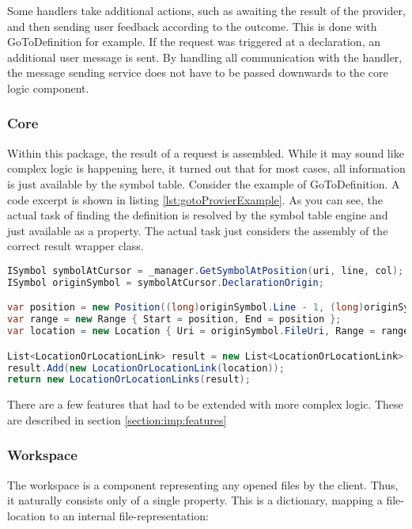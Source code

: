 Some handlers take additional actions, such as awaiting the result of the provider, and then sending user feedback according to the outcome.
This is done with GoToDefinition for example.
If the request was triggered at a declaration, an additional user message is sent.
By handling all communication with the handler, the message sending service does not have to be passed downwards to the core logic component.


\subsubsection{Core}
Within this package, the result of a request is assembled.
While it may sound like complex logic is happening here, it turned out that for most cases, all information is just available by the symbol table.
Consider the example of GoToDefinition.
A code excerpt is shown in listing \ref{lst:gotoProvierExample}.
As you can see, the actual task of finding the definition is resolved by the symbol table engine and just available as a property.
The actual task just considers the assembly of the correct result wrapper class.

\begin{lstlisting}[language=csharp, caption={GoToDefinition, Core Provider}, captionpos=b, label={lst:gotoProvierExample}]
ISymbol symbolAtCursor = _manager.GetSymbolAtPosition(uri, line, col);
ISymbol originSymbol = symbolAtCursor.DeclarationOrigin;

var position = new Position((long)originSymbol.Line - 1, (long)originSymbol.Column - 1);
var range = new Range { Start = position, End = position };
var location = new Location { Uri = originSymbol.FileUri, Range = range };

List<LocationOrLocationLink> result = new List<LocationOrLocationLink>();
result.Add(new LocationOrLocationLink(location));
return new LocationOrLocationLinks(result);
\end{lstlisting}

There are a few features that had to be extended with more complex logic.
These are described in section \ref{section:imp:features}

\subsubsection{Workspace}
The workspace is a component representing any opened files by the client.
Thus, it naturally consists only of a single property.
This is a dictionary, mapping a file-location to an internal file-representation:

